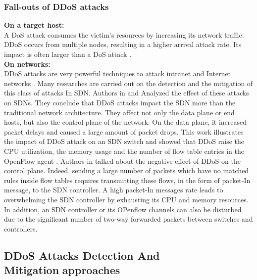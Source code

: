 \subsubsection{Fall-outs of DDoS attacks}
\textbf{On a target host: }\\
A DoS attack consumes the victim's resources by increasing its network traffic. DDoS occurs from multiple nodes, resulting in a higher arrival attack rate. Its impact is often larger than a DoS attack \cite{glass}.\\
\textbf{On networks: }\\
DDoS attacks are very powerful techniques to attack intranet and Internet networks \cite{ddos2019}.
Many researches are carried out on the detection and the mitigation of this class of attacks In SDN. Authors in \cite{analysis1} and \cite{analysis2}Analyzed the effect of these attacks on SDNs. They conclude that DDoS attacks impact the SDN more than  the traditional network architecture. They affect not only the data plane or end hosts, but also the control plane of the network.
On the data plane, it increased packet delays and caused a large amount of packet drops\cite{analysis1}.  This work \cite{analysis2} illustrates the impact of  DDoS attack on an SDN switch and showed that DDoS raise the CPU utilization, the memory usage and the number of flow table entries in  the OpenFlow agent .
 Authors in \cite{insdn} talked about the negative effect of DDoS on the control plane. Indeed,  sending a large number of  packets  which have no matched rules inside flow tables requires transmitting these flows, in the form of packet-In message, to the SDN controller. A high packet-In messages rate leads to overwhelming the SDN controller by exhausting its CPU and memory resources. In addition, an SDN controller or its OPenflow channels can also be disturbed due to the significant number of two-way forwarded packets between switches and controllers.


\subsection{DDoS Attacks Detection And Mitigation\textcolor{white}{.}approaches}

